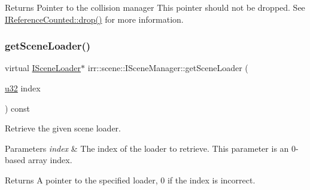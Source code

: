\begin{DoxyReturn}{Returns}
Pointer to the collision manager This pointer should not be dropped. See \hyperlink{classirr_1_1IReferenceCounted_a03856a09355b89d178090c4a5f738543}{I\+Reference\+Counted\+::drop()} for more information. 
\end{DoxyReturn}
\mbox{\label{classirr_1_1scene_1_1ISceneManager_a504fd792634ce0fbace4d13e70e4efab}} 
\subsubsection{\texorpdfstring{get\+Scene\+Loader()}{getSceneLoader()}\hspace{0.1cm}{\footnotesize\ttfamily [1/2]}}
{\footnotesize\ttfamily virtual \hyperlink{classirr_1_1scene_1_1ISceneLoader}{I\+Scene\+Loader}$\ast$ irr\+::scene\+::\+I\+Scene\+Manager\+::get\+Scene\+Loader (\begin{DoxyParamCaption}\item[{\hyperlink{namespaceirr_a0416a53257075833e7002efd0a18e804}{u32}}]{index }\end{DoxyParamCaption}) const\hspace{0.3cm}{\ttfamily [pure virtual]}}



Retrieve the given scene loader. 


\begin{DoxyParams}{Parameters}
{\em index} & The index of the loader to retrieve. This parameter is an 0-\/based array index. \\
\hline
\end{DoxyParams}
\begin{DoxyReturn}{Returns}
A pointer to the specified loader, 0 if the index is incorrect. 
\end{DoxyReturn}
\mbox{\label{classirr_1_1scene_1_1ISceneManager_a504fd792634ce0fbace4d13e70e4efab}} 
